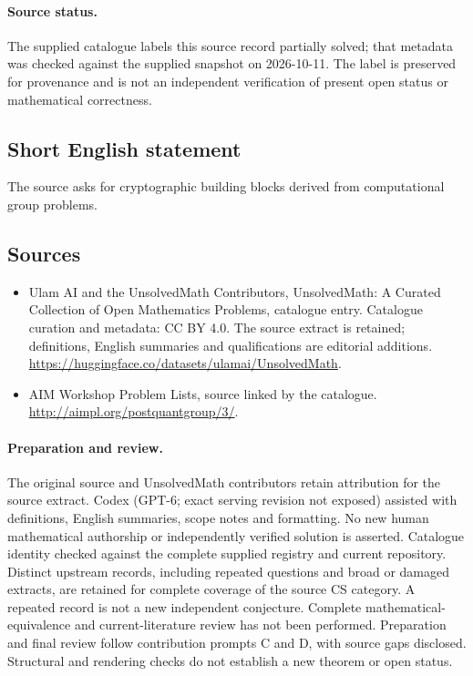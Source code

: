 \documentclass[11pt]{article}
\begin{document}
\paragraph{Source status.}
The supplied catalogue labels this source record partially solved; that metadata was checked against the supplied snapshot on 2026-10-11. The label is preserved for provenance and is not an independent verification of present open status or mathematical correctness.
\subsection{Short English statement}
The source asks for cryptographic building blocks derived from computational group problems.
\subsection{Sources}
\begin{itemize}
\item[\hypertarget{source:statement:1}{S1}] Ulam AI and the UnsolvedMath Contributors, UnsolvedMath: A Curated Collection of Open Mathematics Problems, catalogue entry. Catalogue curation and metadata: CC BY 4.0. The source extract is retained; definitions, English summaries and qualifications are editorial additions.
\url{https://huggingface.co/datasets/ulamai/UnsolvedMath}.
\item[\hypertarget{source:statement:2}{S2}] AIM Workshop Problem Lists, source linked by the catalogue.
\url{http://aimpl.org/postquantgroup/3/}.
\end{itemize}
\paragraph{Preparation and review.}
The original source and UnsolvedMath contributors retain attribution for the source extract. Codex (GPT-6; exact serving revision not exposed) assisted with definitions, English summaries, scope notes and formatting. No new human mathematical authorship or independently verified solution is asserted. Catalogue identity checked against the complete supplied registry and current repository. Distinct upstream records, including repeated questions and broad or damaged extracts, are retained for complete coverage of the source CS category. A repeated record is not a new independent conjecture. Complete mathematical-equivalence and current-literature review has not been performed. Preparation and final review follow contribution prompts C and D, with source gaps disclosed. Structural and rendering checks do not establish a new theorem or open status.
\label{end:statement}
\end{document}
